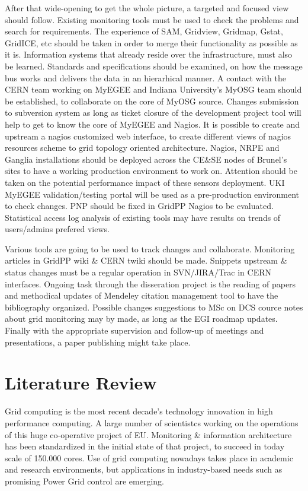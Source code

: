 After that wide-opening to get the whole picture, a targeted and focused
view should follow. Existing monitoring tools must be used to check the problems
and search for requirements. The experience of SAM, Gridview, Gridmap, Gstat,
GridICE, etc should be taken in order to merge their functionality as possible
as it is. Information systems that already reside over the infrastructure, must
also be learned. Standards and specifications should be examined, on how the
message bus works and delivers the data in an hierarhical manner. A contact
with the CERN team working on MyEGEE and Indiana University's MyOSG team should
be established, to collaborate on the core of MyOSG source. Changes submission
to subversion system as long as ticket closure of the development project tool
will help to get to know the core of MyEGEE and Nagios. It is possible to create
and upstream a nagios customized web interface, to create different views of
nagios resources scheme to grid topology oriented architecture. Nagios, NRPE and
Ganglia installations should be deployed across the CE\&SE nodes of Brunel's
sites to have a working production environment to work on. Attention should be
taken on the potential performance impact of these sensors deployment. UKI
MyEGEE validation/testing portal will be used as a pre-production environment
to check changes. PNP should be fixed in GridPP Nagios to be evaluated.
Statistical access log analysis of existing tools may have results on trends of
users/admins prefered views.

Various tools are going to be used to track changes and collaborate. Monitoring
articles in GridPP wiki \& CERN twiki should be made. Snippets upstream \&
status changes must be a regular operation in SVN/JIRA/Trac in CERN interfaces.
Ongoing task through the disseration project is the reading of papers and
methodical updates of Mendeley citation management tool to have the bibliography
organized. Possible changes suggestions to MSc on DCS cource notes about grid
monitoring may by made, as long as the EGI roadmap updates. Finally with the
appropriate supervision and follow-up of meetings and presentations, a paper publishing
might take place.

\section{Literature Review}

Grid computing \cite{li2005grid} is the most recent decade's technology
innovation in high performance computing. A large number of scientistcs working
on the operations of this huge co-operative project of EU. Monitoring \&
information architecture \cite{fisher2002datagrid} has been standardized in the
initial state of that project, to succeed in today scale of 150.000 cores. Use
of grid computing nowadays takes place in academic and research environments,
but applications in industry-based needs such as promising Power Grid control
\cite{Taylor2006} are emerging.

